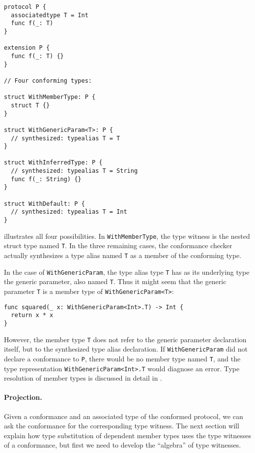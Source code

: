 \documentclass[../generics]{subfiles}
\begin{document}
\begin{listing}\label{type witness listing}
\begin{Verbatim}
protocol P {
  associatedtype T = Int
  func f(_: T)
}

extension P {
  func f(_: T) {}
}

// Four conforming types:

struct WithMemberType: P {
  struct T {}
}

struct WithGenericParam<T>: P {
  // synthesized: typealias T = T
}

struct WithInferredType: P {
  // synthesized: typealias T = String
  func f(_: String) {}
}

struct WithDefault: P {
  // synthesized: typealias T = Int
}
\end{Verbatim}
\end{listing}

\begin{example}
 illustrates all four possibilities. In \texttt{WithMemberType}, the type witness is the nested struct type named \texttt{T}. In the three remaining cases, the conformance checker actually synthesizes a type alias named \texttt{T} as a member of the conforming type.

In the case of \texttt{WithGenericParam}, the type alias type \texttt{T} has as its underlying type the generic parameter, also named \texttt{T}. Thus it might seem that the generic parameter \texttt{T} is a member type of \texttt{WithGenericParam<T>}:
\begin{Verbatim}
func squared(_ x: WithGenericParam<Int>.T) -> Int {
  return x * x
}
\end{Verbatim}

However, the member type \texttt{T} does not refer to the generic parameter declaration itself, but to the synthesized type alias declaration. If \texttt{WithGenericParam} did not declare a conformance to \texttt{P}, there would be no member type named \texttt{T}, and the type representation \texttt{WithGenericParam<Int>.T} would diagnose an error. Type resolution of member types is discussed in detail in .
\end{example}

\paragraph{Projection.}
%
%
Given a conformance and an associated type of the conformed protocol, we can ask the conformance for the corresponding type witness. The next section will explain how type substitution of dependent member types uses the type witnesses of a conformance, but first we need to develop the ``algebra'' of type witnesses.
\end{document}
